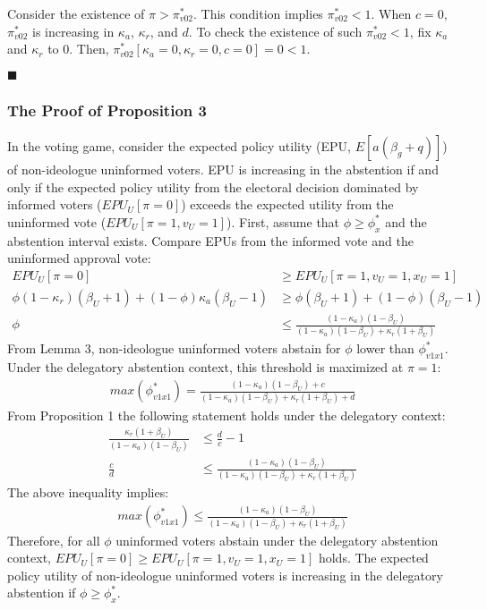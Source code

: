 \par Consider the existence of $\pi > \pi^*_{v02}$. This condition implies $\pi^*_{v02} <1$. When $c=0$, $\pi^*_{v02}$ is increasing in $\kappa_a$, $\kappa_r$, and $d$. To check the existence of such $\pi^*_{v02} <1$, fix $\kappa_a$ and $\kappa_r$ to $0$. Then, $\pi^*_{v02}[\kappa_a=0,\kappa_r=0,c=0] = 0 < 1$.

\hfill $\blacksquare$ 

\subsubsection{The Proof of Proposition 3}

\par In the voting game, consider the expected policy utility (EPU, $E[a(\beta_g + q)]$) of non-ideologue uninformed voters. EPU is increasing in the abstention if and only if the expected policy utility from the electoral decision dominated by informed voters ($EPU_U[\pi=0]$) exceeds the expected utility from the uninformed vote ($EPU_U[\pi=1,v_U=1]$). First, assume that $\phi \geq \phi^*_x$ and the abstention interval exists. Compare EPUs from the informed vote and the uninformed approval vote:  
\begin{align*}
EPU_U[\pi=0] &\geq EPU_U[\pi=1,v_U=1,x_U=1] \\
\phi(1-\kappa_r)(\beta_U+1) + (1-\phi)\kappa_a(\beta_U-1) &\geq \phi(\beta_U+1) + (1-\phi)(\beta_U-1) \\
\phi &\leq \frac{(1-\kappa_a)(1-\beta_U)}{(1-\kappa_a)(1-\beta_U)+\kappa_r(1+\beta_U)}
\end{align*}
\noindent From Lemma 3, non-ideologue uninformed voters abstain for $\phi$ lower than $\phi^*_{v1x1}$. Under the delegatory abstention context, this threshold is maximized at $\pi=1$: 
\begin{align*}
max(\phi^*_{v1x1}) = \frac{(1-\kappa_a)(1-\beta_U) + c}{(1-\kappa_a)(1-\beta_U)+\kappa_r(1+\beta_U) + d}
\end{align*}
From Proposition 1 the following statement holds under the delegatory context:
\begin{align*}
\frac{\kappa_r(1+\beta_U)}{(1-\kappa_a)(1-\beta_U)} &\leq \frac{d}{c} - 1\\
\frac{c}{d} &\leq \frac{(1-\kappa_a)(1-\beta_U)}{(1-\kappa_a)(1-\beta_U)+\kappa_r(1+\beta_U)}
\end{align*}
The above inequality implies:  
\begin{align*}
max(\phi^*_{v1x1}) \leq \frac{(1-\kappa_a)(1-\beta_U)}{(1-\kappa_a)(1-\beta_U)+\kappa_r(1+\beta_U)}
\end{align*}
\noindent Therefore, for all $\phi$ uninformed voters abstain under the delegatory abstention context, $EPU_U[\pi=0] \geq EPU_U[\pi=1,v_U=1,x_U=1]$ holds. The expected policy utility of non-ideologue uninformed voters is increasing in the delegatory abstention if $\phi \geq \phi^*_x$. 

